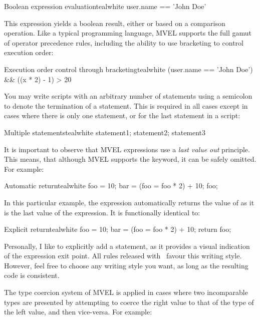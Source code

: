 \begin{codebox}{Boolean expression evaluation}{teal}{\icnote}{white}
user.name == 'John Doe'
\end{codebox}

This expression yields a boolean result, either  or  based on a comparison operation. Like a typical programming language, MVEL supports the full gamut of operator precedence rules, including the ability to use bracketing to control execution order:

\begin{codebox}{Execution order control through bracketing}{teal}{\icnote}{white}
(user.name == 'John Doe') && ((x * 2) - 1) > 20
\end{codebox}

You may write scripts with an arbitrary number of statements using a semicolon to denote the termination of a statement. This is required in all cases except in cases where there is only one statement, or for the last statement in a script:

\begin{codebox}{Multiple statements}{teal}{\icnote}{white}
statement1; statement2; statement3
\end{codebox}

It is important to observe that MVEL expressions use a \emph{last value out} principle. This means, that although MVEL supports the  keyword, it can be safely omitted. For example:

\begin{codebox}{Automatic return}{teal}{\icnote}{white}
foo = 10;
bar = (foo = foo * 2) + 10;
foo;
\end{codebox}

In this particular example, the expression automatically returns the value of  as it is the last value of the expression. It is functionally identical to:

\begin{codebox}{Explicit return}{teal}{\icnote}{white}
foo = 10;
bar = (foo = foo * 2) + 10;
return foo;
\end{codebox}

Personally, I like to explicitly add a  statement, as it provides a visual indication of the expression exit point. All rules released with \arara\ favour this writing style. However, feel free to choose any writing style you want, as long as the resulting code is consistent.

The type coercion system of MVEL is applied in cases where two incomparable types are presented by attempting to coerce the right value to that of the type of the left value, and then vice-versa. For example:

